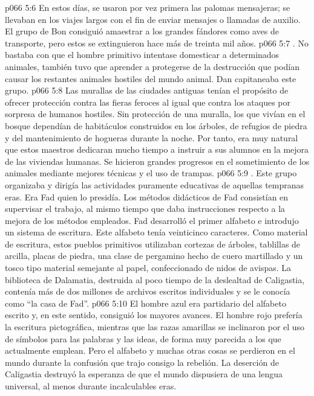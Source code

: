 \vs p066 5:6 En estos días, se usaron por vez primera las palomas mensajeras; se llevaban en los viajes largos con el fin de enviar mensajes o llamadas de auxilio. El grupo de Bon consiguió amaestrar a los grandes fándores como aves de transporte, pero estos se extinguieron hace más de treinta mil años.
\vs p066 5:7 . No bastaba con que el hombre primitivo intentase domesticar a determinados animales, también tuvo que aprender a protegerse de la destrucción que podían causar los restantes animales hostiles del mundo animal. Dan capitaneaba este grupo.
\vs p066 5:8 Las murallas de las ciudades antiguas tenían el propósito de ofrecer protección contra las fieras feroces al igual que contra los ataques por sorpresa de humanos hostiles. Sin protección de una muralla, los que vivían en el bosque dependían de habitáculos construidos en los árboles, de refugios de piedra y del mantenimiento de hogueras durante la noche. Por tanto, era muy natural que estos maestros dedicaran mucho tiempo a instruir a sus alumnos en la mejora de las viviendas humanas. Se hicieron grandes progresos en el sometimiento de los animales mediante mejores técnicas y el uso de trampas.
\vs p066 5:9 . Este grupo organizaba y dirigía las actividades puramente educativas de aquellas tempranas eras. Era Fad quien lo presidía. Los métodos didácticos de Fad consistían en supervisar el trabajo, al mismo tiempo que daba instrucciones respecto a la mejora de los métodos empleados. Fad desarrolló el primer alfabeto e introdujo un sistema de escritura. Este alfabeto tenía veinticinco caracteres. Como material de escritura, estos pueblos primitivos utilizaban cortezas de árboles, tablillas de arcilla, placas de piedra, una clase de pergamino hecho de cuero martillado y un tosco tipo material semejante al papel, confeccionado de nidos de avispas. La biblioteca de Dalamatia, destruida al poco tiempo de la deslealtad de Caligastia, contenía más de dos millones de archivos escritos individuales y se le conocía como “la casa de Fad”.
\vs p066 5:10 El hombre azul era partidario del alfabeto escrito y, en este sentido, consiguió los mayores avances. El hombre rojo prefería la escritura pictográfica, mientras que las razas amarillas se inclinaron por el uso de símbolos para las palabras y las ideas, de forma muy parecida a los que actualmente emplean. Pero el alfabeto y muchas otras cosas se perdieron en el mundo durante la confusión que trajo consigo la rebelión. La deserción de Caligastia destruyó la esperanza de que el mundo dispusiera de una lengua universal, al menos durante incalculables eras.
